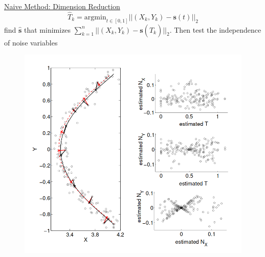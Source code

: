 \documentclass{beamer}
\begin{document}
\begin{frame}
\begin{columns}
\begin{column}{0.67\textwidth}
\scriptsize{
\underline{Naive Method: Dimension Reduction}
$$\hat{T}_k = \mathrm{argmin}_{t\in[0,1]} ||(X_k, Y_k) - \mathbf{s}(t)||_2$$ find $\hat{\mathbf{s}}$ that minimizes 
$\sum^n_{k=1} ||(X_k, Y_k) - \mathbf{s}(\hat{T}_k)||_2$. Then test the independence of noise variables}
\begin{figure}
	\includegraphics[scale = 0.17]{dimred.png}
\end{figure}
\end{column}
\end{columns}
\end{frame}
\end{document}
